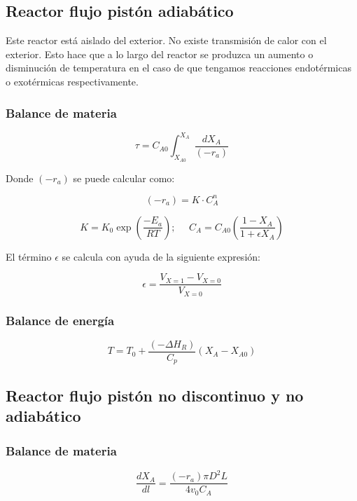 \documentclass[20pt,a4paper]{extarticle}
\begin{document}
		
		\subsection{Reactor flujo pistón adiabático}
		Este reactor está aislado del exterior. No existe transmisión de calor con el exterior. Esto hace que a lo largo del reactor se produzca un aumento o disminución de temperatura en el caso de que tengamos reacciones endotérmicas o exotérmicas respectivamente.
		
		\subsubsection{Balance de materia}
		\begin{equation*}
		\tau = C_{A0}\int_{X_{A0}}^{X_A}\frac{dX_A}{(-r_a)}
		\end{equation*}
		
			Donde $(-r_a)$ se puede calcular como:
			
			\begin{equation*}
			(-r_a) = K \cdot C_{A}^n
			\end{equation*}
			
			\begin{equation*}
			K = K_0\exp\left(\frac{-E_a}{RT}\right);~~~~~~
			C_{A} = C_{A0}(\frac{1 - X_A}{1 + \epsilon X_A})
			\end{equation*}
			
				El término $\epsilon$ se calcula con ayuda de la siguiente expresión:
				
				\begin{equation*}
				\epsilon = \frac{V_{X=1} - V_{X=0}}{V_{X=0}}
				\end{equation*}
				
		\subsubsection{Balance de energía}
			\begin{equation*}
			T = T_0 + \frac{(-\Delta H_R)}{C_p}(X_A-X_{A0})
			\end{equation*}
		
		\subsection{Reactor flujo pistón no discontinuo y no adiabático}
		
		\subsubsection{Balance de materia}
		\begin{equation*}
		\frac{dX_A}{dl} = \frac{(-r_a)\pi D^2 L}{4v_0C_A} 
		\end{equation*}
		
\end{document}
